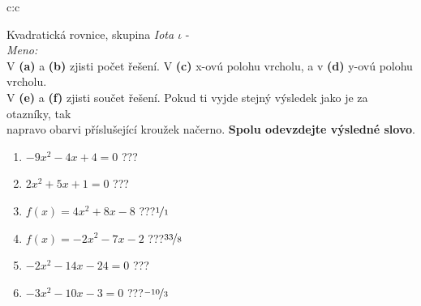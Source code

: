 \documentclass[10pt]{report}
\begin{document}
\clearpage
\thispagestyle{empty}
\begin{tabular}{c:c}
\begin{minipage}[c][99mm][t]{0.49\linewidth}
\begin{center}
\vspace{7mm}
{\huge Kvadratická rovnice, skupina \textit{Iota $\iota$} -}\\[4.5mm]
\textit{Meno:}\phantom{xxxxxxxxxxxxxxxxxxxxxxxxxxxxxxxxxxxxxxxxxxxxxxxxxxxxxxxxxxxxxxxxx}\\[3.5mm]
V \textbf{(a)} a \textbf{(b)} zjisti počet řešení. V \textbf{(c)} x-ovú polohu vrcholu, a v \textbf{(d)} y-ovú polohu vrcholu.\\V \textbf{(e)} a \textbf{(f)} zjisti součet řešení. Pokud ti vyjde stejný výsledek jako je za otazníky, tak\\napravo obarvi příslušející kroužek načerno. \textbf{Spolu odevzdejte výsledné slovo}.\\[3mm]
\begin{minipage}{0.77\linewidth}
\begin{center}
\begin{varwidth}{\textwidth}
\begin{enumerate}
\large
\item $-9x^2-4x+4=0$\quad \dotfill\; ???\;\dotfill {}
\item $2x^2+5x+1=0$\quad \dotfill\; ???\;\dotfill {}
\item $f(x)=4x^2+8x-8$\quad \dotfill\; ???\;\dotfill \quad $\nicefrac{1}{1}$
\item $f(x)=-2x^2-7x-2$\quad \dotfill\; ???\;\dotfill \quad $\nicefrac{33}{8}$
\item $-2x^2-14x-24=0$\quad \dotfill\; ???\;\dotfill {}
\item $-3x^2-10x-3=0$\quad \dotfill\; ???\;\dotfill \quad $\nicefrac{-10}{3}$
\end{enumerate}
\end{varwidth}
\end{center}
\end{minipage}

\end{center}
\end{minipage}
\end{tabular}
\end{document}
